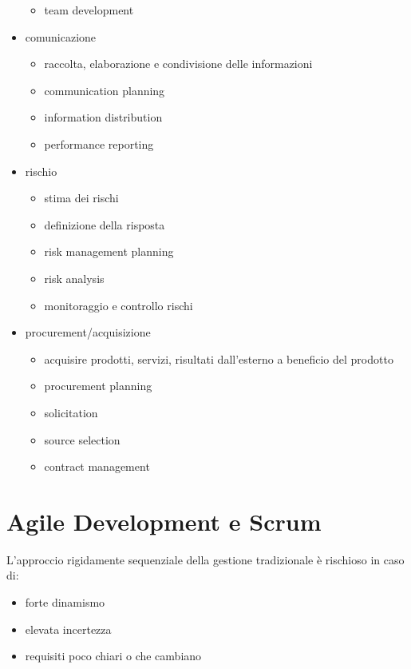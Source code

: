 \documentclass[answers, a4paper, 11pt]{exam}
\begin{document}
\begin{itemize}
\begin{itemize}
        \item team development
    \end{itemize}
    \item comunicazione
    \begin{itemize}
        \item raccolta, elaborazione e condivisione delle informazioni
        \item communication planning
        \item information distribution
        \item performance reporting
    \end{itemize}
    \item rischio
    \begin{itemize}
        \item stima dei rischi
        \item definizione della risposta
        \item risk management planning
        \item risk analysis
        \item monitoraggio e controllo rischi
    \end{itemize}
    \item procurement/acquisizione
    \begin{itemize}
        \item acquisire prodotti, servizi, risultati dall'esterno a beneficio del prodotto
        \item procurement planning
        \item solicitation
        \item source selection
        \item contract management
    \end{itemize}
\end{itemize}


\section{Agile Development e Scrum}
L'approccio rigidamente sequenziale della gestione tradizionale è rischioso in caso di:

\begin{itemize}
    \item forte dinamismo
    \item elevata incertezza
    \item requisiti poco chiari o che cambiano
\end{itemize}
\end{document}

